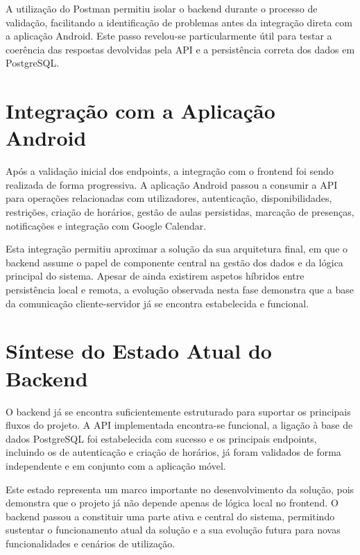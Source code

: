 A utilização do Postman permitiu isolar o backend durante o processo de validação, facilitando a identificação de problemas antes da integração direta com a aplicação Android.
Este passo revelou-se particularmente útil para testar a coerência das respostas devolvidas pela API e a persistência correta dos dados em PostgreSQL.

\section{Integração com a Aplicação Android}

Após a validação inicial dos endpoints, a integração com o frontend foi sendo realizada de forma progressiva.
A aplicação Android passou a consumir a API para operações relacionadas com utilizadores, autenticação, disponibilidades, restrições, criação de horários, gestão de aulas persistidas, marcação de presenças, notificações e integração com Google Calendar.

Esta integração permitiu aproximar a solução da sua arquitetura final, em que o backend assume o papel de componente central na gestão dos dados e da lógica principal do sistema.
Apesar de ainda existirem aspetos híbridos entre persistência local e remota, a evolução observada nesta fase demonstra que a base da comunicação cliente-servidor já se encontra estabelecida e funcional.

\section{Síntese do Estado Atual do Backend}

O backend já se encontra suficientemente estruturado para suportar os principais fluxos do projeto.
A API implementada encontra-se funcional, a ligação à base de dados PostgreSQL foi estabelecida com sucesso e os principais
endpoints, incluindo os de autenticação e criação de horários, já foram validados de forma independente e em conjunto com a aplicação móvel.

Este estado representa um marco importante no desenvolvimento da solução, pois demonstra que o projeto já não depende apenas de lógica local no frontend.
O backend passou a constituir uma parte ativa e central do sistema, permitindo sustentar o funcionamento atual da solução e a sua evolução futura para novas funcionalidades e cenários de utilização.
